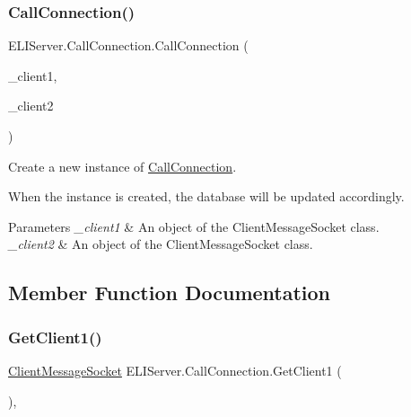 \subsubsection{\texorpdfstring{Call\+Connection()}{CallConnection()}}
{\footnotesize\ttfamily E\+L\+I\+Server.\+Call\+Connection.\+Call\+Connection (\begin{DoxyParamCaption}\item[{\hyperlink{class_e_l_i_server_1_1_messaging_1_1_client_message_socket}{Client\+Message\+Socket}}]{\+\_\+client1,  }\item[{\hyperlink{class_e_l_i_server_1_1_messaging_1_1_client_message_socket}{Client\+Message\+Socket}}]{\+\_\+client2 }\end{DoxyParamCaption})\hspace{0.3cm}{\ttfamily [inline]}}





Create a new instance of \hyperlink{class_e_l_i_server_1_1_call_connection}{Call\+Connection}.

When the instance is created, the database will be updated accordingly. 


\begin{DoxyParams}{Parameters}
{\em \+\_\+client1} & An object of the Client\+Message\+Socket class.\\
\hline
{\em \+\_\+client2} & An object of the Client\+Message\+Socket class.\\
\hline
\end{DoxyParams}


\subsection{Member Function Documentation}
\mbox{\label{class_e_l_i_server_1_1_call_connection_ae65d1e69b626abc7d354ca87ab800b12}} 
\subsubsection{\texorpdfstring{Get\+Client1()}{GetClient1()}}
{\footnotesize\ttfamily \hyperlink{class_e_l_i_server_1_1_messaging_1_1_client_message_socket}{Client\+Message\+Socket} E\+L\+I\+Server.\+Call\+Connection.\+Get\+Client1 (\begin{DoxyParamCaption}{ }\end{DoxyParamCaption})\hspace{0.3cm}{\ttfamily [inline]}, {\ttfamily [package]}}




